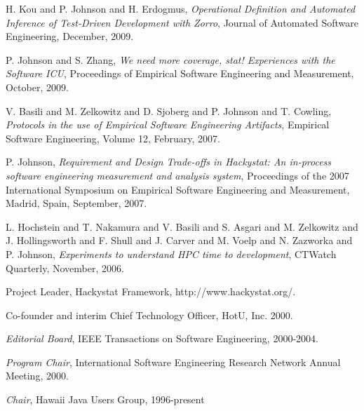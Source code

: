 \begin{Publications: Other Significant}

\item H. Kou and P. Johnson and H. Erdogmus, {\em Operational Definition and 
Automated Inference of Test-Driven Development with Zorro}, 
Journal of Automated Software Engineering, December, 2009.

\item P. Johnson and S. Zhang, {\em We need more coverage, stat!  Experiences with the Software ICU}, 
Proceedings of  Empirical Software Engineering and Measurement, October, 2009.
  
\item V. Basili and M. Zelkowitz and D. Sjoberg and P. Johnson and T. Cowling,
{\em Protocols in the use of Empirical Software Engineering Artifacts}, 
Empirical Software Engineering, Volume 12, February, 2007.

\item P. Johnson, {\em Requirement and Design Trade-offs in Hackystat: An
in-process software engineering measurement and analysis system},
Proceedings of the 2007 International Symposium on Empirical Software
Engineering and Measurement, Madrid, Spain, September, 2007.

\item L. Hochstein and T. Nakamura and V. Basili and S. Asgari and 
M. Zelkowitz and J. Hollingsworth and F. Shull and J. Carver and 
M. Voelp and N. Zazworka and P. Johnson, {\em Experiments to 
understand HPC time to development}, CTWatch Quarterly, 
November, 2006.

\end{Publications: Other Significant}


\begin{Synergistic Activities}

\item {Project Leader}, Hackystat Framework, http://www.hackystat.org/.

\item {Co-founder and interim Chief Technology Officer}, HotU, Inc.  2000.

\item {\em Editorial Board}, IEEE Transactions on Software Engineering,
2000-2004.

\item {\em Program Chair}, International Software Engineering Research Network
 Annual Meeting, 2000.

\item {\em Chair}, Hawaii Java Users Group, 1996-present

\end{Synergistic Activities}


